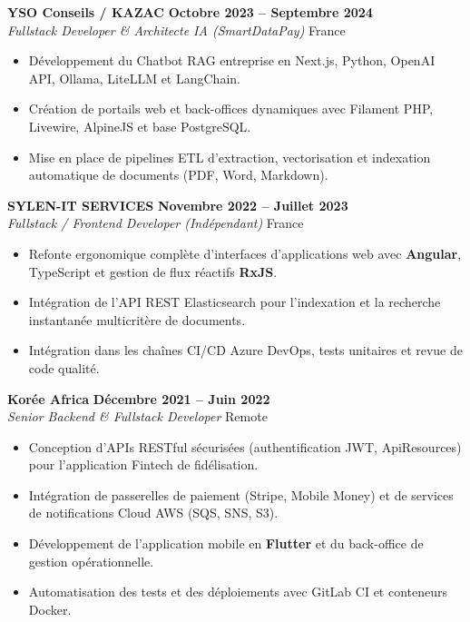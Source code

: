 \documentclass[10pt,a4paper]{article}
\begin{document}
\vspace{0.35em}

\textbf{\large YSO Conseils / KAZAC} \hfill {\bfseries\small\color{slateGray} Octobre 2023 -- Septembre 2024} \\
\emph{\color{primary}Fullstack Developer \& Architecte IA (SmartDataPay)} \hfill {\small France}
\begin{itemize}[leftmargin=1.4em, itemsep=0.18em, topsep=0.15em]
    \item Développement du Chatbot RAG entreprise en Next.js, Python, OpenAI API, Ollama, LiteLLM et LangChain.
    \item Création de portails web et back-offices dynamiques avec Filament PHP, Livewire, AlpineJS et base PostgreSQL.
    \item Mise en place de pipelines ETL d'extraction, vectorisation et indexation automatique de documents (PDF, Word, Markdown).
\end{itemize}

\newpage

\textbf{\large SYLEN-IT SERVICES} \hfill {\bfseries\small\color{slateGray} Novembre 2022 -- Juillet 2023} \\
\emph{\color{primary}Fullstack / Frontend Developer (Indépendant)} \hfill {\small France}
\begin{itemize}[leftmargin=1.4em, itemsep=0.18em, topsep=0.15em]
    \item Refonte ergonomique complète d'interfaces d'applications web avec \textbf{Angular}, TypeScript et gestion de flux réactifs \textbf{RxJS}.
    \item Intégration de l'API REST Elasticsearch pour l'indexation et la recherche instantanée multicritère de documents.
    \item Intégration dans les chaînes CI/CD Azure DevOps, tests unitaires et revue de code qualité.
\end{itemize}

\vspace{0.4em}

\textbf{\large Korée Africa} \hfill {\bfseries\small\color{slateGray} Décembre 2021 -- Juin 2022} \\
\emph{\color{primary}Senior Backend \& Fullstack Developer} \hfill {\small Remote}
\begin{itemize}[leftmargin=1.4em, itemsep=0.18em, topsep=0.15em]
    \item Conception d'APIs RESTful sécurisées (authentification JWT, ApiResources) pour l'application Fintech de fidélisation.
    \item Intégration de passerelles de paiement (Stripe, Mobile Money) et de services de notifications Cloud AWS (SQS, SNS, S3).
    \item Développement de l'application mobile en \textbf{Flutter} et du back-office de gestion opérationnelle.
    \item Automatisation des tests et des déploiements avec GitLab CI et conteneurs Docker.
\end{itemize}
\end{document}
